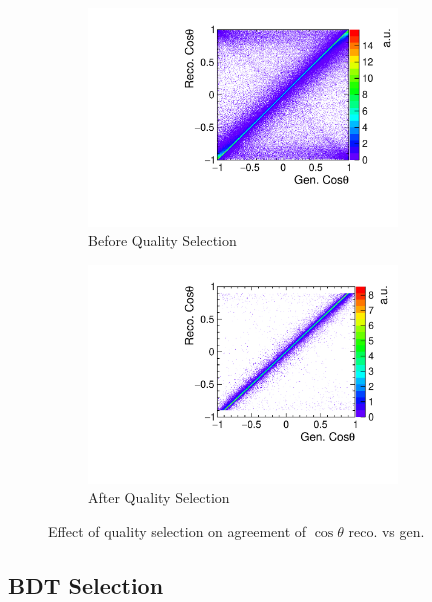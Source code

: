 \begin{figure}
  \centering
  \begin{subfigure}{.5\textwidth}
    \centering
    \includegraphics[width=0.9\textwidth]{TopAnalysis/figures/CosThetaRecoVsMC.pdf}
    \caption{Before Quality Selection}
  \end{subfigure}%
  \begin{subfigure}{.5\textwidth}
    \centering
    \includegraphics[width=0.9\textwidth]{TopAnalysis/figures/CosThetaRecoVsMC_QualityCuts.pdf}
    \caption{After Quality Selection}
  \end{subfigure}
  \caption[Effect of quality selection on agreement of $\cos\theta$ reco. vs gen.]{Effect of quality selection on agreement of $\cos\theta$ reco. vs gen.}
  \label{fig:qualitycuts}
\end{figure}


\subsection{BDT Selection}

